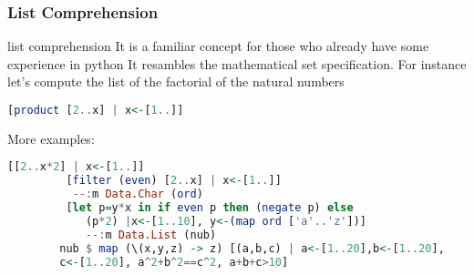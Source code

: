 	
	\begin{frame}[fragile]\frametitle{List Comprehension}
		\begin{exampleblock}{list comprehension}
		It is a familiar concept for those who already have some experience in python
		It resambles the mathematical set specification. For instance let's compute
		the list of the factorial of the natural numbers 
		 \begin{lstlisting}[language=Haskell,basicstyle=\footnotesize\ttfamily] 
		 [product [2..x] | x<-[1..]] 		
		\end{lstlisting} 
		\end{exampleblock}
		More examples:
		\begin{lstlisting}[language=Haskell,basicstyle=\footnotesize\ttfamily] 
		 [[2..x*2] | x<-[1..]]
		 [filter (even) [2..x] | x<-[1..]]
		  --:m Data.Char (ord)
		 [let p=y*x in if even p then (negate p) else 
		 	(p*2) |x<-[1..10], y<-(map ord ['a'..'z'])]
		 	--:m Data.List (nub) 
		nub $ map (\(x,y,z) -> z) [(a,b,c) | a<-[1..20],b<-[1..20],
		c<-[1..20], a^2+b^2==c^2, a+b+c>10]
		\end{lstlisting}
			
		
	\end{frame}
	
	